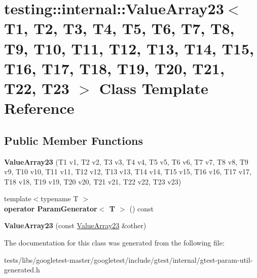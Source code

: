 \hypertarget{classtesting_1_1internal_1_1ValueArray23}{}\section{testing\+:\+:internal\+:\+:Value\+Array23$<$ T1, T2, T3, T4, T5, T6, T7, T8, T9, T10, T11, T12, T13, T14, T15, T16, T17, T18, T19, T20, T21, T22, T23 $>$ Class Template Reference}
\label{classtesting_1_1internal_1_1ValueArray23}
\subsection*{Public Member Functions}
\begin{DoxyCompactItemize}
\item 
\mbox{\label{classtesting_1_1internal_1_1ValueArray23_a39a294eac1033599b11fde99d8c211ac}} 
{\bfseries Value\+Array23} (T1 v1, T2 v2, T3 v3, T4 v4, T5 v5, T6 v6, T7 v7, T8 v8, T9 v9, T10 v10, T11 v11, T12 v12, T13 v13, T14 v14, T15 v15, T16 v16, T17 v17, T18 v18, T19 v19, T20 v20, T21 v21, T22 v22, T23 v23)
\item 
\mbox{\label{classtesting_1_1internal_1_1ValueArray23_a667a3e2676bba0d87007e2b1425431c6}} 
{\footnotesize template$<$typename T $>$ }\\{\bfseries operator Param\+Generator$<$ T $>$} () const
\item 
\mbox{\label{classtesting_1_1internal_1_1ValueArray23_ae953048d6022e967bc710419068f6cb7}} 
{\bfseries Value\+Array23} (const \hyperlink{classtesting_1_1internal_1_1ValueArray23}{Value\+Array23} \&other)
\end{DoxyCompactItemize}


The documentation for this class was generated from the following file\+:\begin{DoxyCompactItemize}
\item 
tests/libs/googletest-\/master/googletest/include/gtest/internal/gtest-\/param-\/util-\/generated.\+h\end{DoxyCompactItemize}
